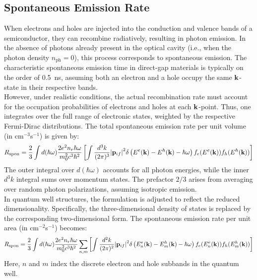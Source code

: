 \subsection{Spontaneous Emission Rate}
When electrons and holes are injected into the conduction and valence bands of a semiconductor, they can recombine radiatively, resulting in photon emission. In the absence of photons already present in the optical cavity (i.e., when the photon density \( n_{\text{ph}} = 0 \)), this process corresponds to spontaneous emission. The characteristic spontaneous emission time in direct-gap materials is typically on the order of 0.5~ns, assuming both an electron and a hole occupy the same \( \vb{k} \)-state in their respective bands.\\
However, under realistic conditions, the actual recombination rate must account for the occupation probabilities of electrons and holes at each \( \vb{k} \)-point. Thus, one integrates over the full range of electronic states, weighted by the respective Fermi-Dirac distributions. The total spontaneous emission rate per unit volume (in cm\(^{-3}\)s\(^{-1}\)) is given by:
\begin{equation}
	R_{\text{spon}} = \frac{2}{3} \int d(\hbar \omega) \frac{2e^2 n_r \hbar \omega}{m_0^2 c^3 \hbar^2}
	\left[
		\int \frac{d^3 k}{(2\pi)^3} \abs{\vb{p}_{if}}^2
		\delta \left( E^e(\vb{k}) - E^h(\vb{k}) - \hbar \omega \right)
		f_e(E^e(\vb{k})) f_h(E^h(\vb{k}))
		\right]
\end{equation}
The outer integral over \( d(\hbar \omega) \) accounts for all photon energies, while the inner \( d^3k \) integral sums over momentum states. The prefactor \( 2/3 \) arises from averaging over random photon polarizations, assuming isotropic emission.\\
In quantum well structures, the formulation is adjusted to reflect the reduced dimensionality. Specifically, the three-dimensional density of states is replaced by the corresponding two-dimensional form. The spontaneous emission rate per unit area (in cm\(^{-2}\)s\(^{-1}\)) becomes:
\begin{equation}
	R_{\text{spon}} = \frac{2}{3} \int d(\hbar \omega) \frac{2e^2 n_r \hbar \omega}{m_0^2 c^3 \hbar^2}
	\sum_{n,m}
	\left[
		\int \frac{d^2 k}{(2\pi)^2} \abs{\vb{p}_{if}}^2
		\delta \left( E_n^e(\vb{k}) - E_m^h(\vb{k}) - \hbar \omega \right)
		f_e(E_n^e(\vb{k})) f_h(E_m^h(\vb{k}))
		\right]
\end{equation}
Here, \( n \) and \( m \) index the discrete electron and hole subbands in the quantum well.\\
